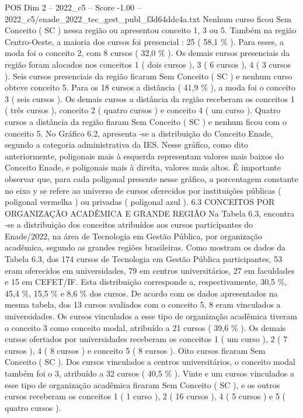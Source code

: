 \begin{textsample}{POS Dim 2 – 2022\_c5 – Score -1.00 – 2022\_c5/enade\_2022\_tec\_gest\_publ\_f3d64ddc4a.txt}
Nenhum curso ficou Sem Conceito ( SC ) nessa região ou apresentou conceito 1, 3 ou 5.
Também na região Centro-Oeste, a maioria dos cursos foi presencial : 25 ( 58,1 \% ).
Para esses, a moda foi o conceito 2, com 8 cursos ( 32,0 \% ).
Os demais cursos presenciais da região foram alocados nos conceitos 1 ( dois cursos ), 3 ( 6 cursos ), 4 ( 3 cursos ).
Seis cursos presenciais da região ficaram Sem Conceito ( SC ) e nenhum curso obteve conceito 5.
Para os 18 cursos a distância ( 41,9 \% ), a moda foi o conceito 3 ( seis cursos ).
Os demais cursos a distância da região receberam os conceitos 1 ( três cursos ), conceito 2 ( quatro cursos ) e conceito 4 ( um curso ).
Quatro cursos a distância da região fiaram Sem Conceito ( SC ) e nenhum ficou com o conceito 5.
No Gráfico 6.2, apresenta -se a distribuição do Conceito Enade, segundo a categoria administrativa da IES.
Nesse gráfico, como dito anteriormente, poligonais mais à esquerda representam valores mais baixos do Conceito Enade, e poligonais mais à direita, valores mais altos.
É importante observar que, para cada poligonal presente nesse gráfico, a porcentagem constante no eixo y se refere ao universo de cursos oferecidos por instituições públicas ( poligonal vermelha ) ou privadas ( poligonal azul ). 6.3 CONCEITOS POR ORGANIZAÇÃO ACADÊMICA E GRANDE REGIÃO Na Tabela 6.3, encontra -se a distribuição dos conceitos atribuídos aos cursos participantes do Enade/2022, na área de Tecnologia em Gestão Pública, por organização acadêmica, segundo as grandes regiões brasileiras.
Como mostram os dados da Tabela 6.3, dos 174 cursos de Tecnologia em Gestão Pública participantes, 53 eram oferecidos em universidades, 79 em centros universitários, 27 em faculdades e 15 em CEFET/IF.
Esta distribuição corresponde a, respectivamente, 30,5 \%, 45,4 \%, 15,5 \% e 8,6 \% dos cursos.
De acordo com os dados apresentados na mesma tabela, dos 13 cursos avaliados com o conceito 5, 8 eram vinculados a universidades.
Os cursos vinculados a esse tipo de organização acadêmica tiveram o conceito 3 como conceito modal, atribuído a 21 cursos ( 39,6 \% ).
Os demais cursos ofertados por universidades receberam os conceitos 1 ( um curso ), 2 ( 7 cursos ), 4 ( 8 cursos ) e conceito 5 ( 8 cursos ).
Oito cursos ficaram Sem Conceito ( SC ).
Dos cursos vinculados a centros universitários, o conceito modal também foi o 3, atribuído a 32 cursos ( 40,5 \% ).
Vinte e um cursos vinculados a esse tipo de organização acadêmica ficaram Sem Conceito ( SC ), e os outros cursos receberam os conceitos 1 ( 1 curso ), 2 ( 16 cursos ), 4 ( 5 cursos ) e 5 ( quatro cursos ).

\end{textsample}
